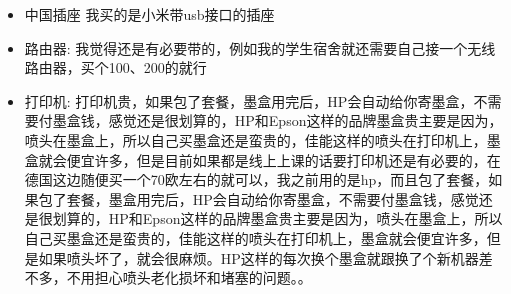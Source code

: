 \documentclass[doku]{subfiles}
\begin{document}
\begin{itemize}
	\item 中国插座 我买的是小米带usb接口的插座
	\item 路由器: 我觉得还是有必要带的，例如我的学生宿舍就还需要自己接一个无线路由器，买个100、200的就行
	\item 打印机: 打印机贵，如果包了套餐，墨盒用完后，HP会自动给你寄墨盒，不需要付墨盒钱，感觉还是很划算的，HP和Epson这样的品牌墨盒贵主要是因为，喷头在墨盒上，所以自己买墨盒还是蛮贵的，佳能这样的喷头在打印机上，墨盒就会便宜许多，但是目前如果都是线上上课的话要打印机还是有必要的，在德国这边随便买一个70欧左右的就可以，我之前用的是hp，而且包了套餐，如果包了套餐，墨盒用完后，HP会自动给你寄墨盒，不需要付墨盒钱，感觉还是很划算的，HP和Epson这样的品牌墨盒贵主要是因为，喷头在墨盒上，所以自己买墨盒还是蛮贵的，佳能这样的喷头在打印机上，墨盒就会便宜许多，但是如果喷头坏了，就会很麻烦。HP这样的每次换个墨盒就跟换了个新机器差不多，不用担心喷头老化损坏和堵塞的问题。。
	
\end{itemize}
\end{document}

